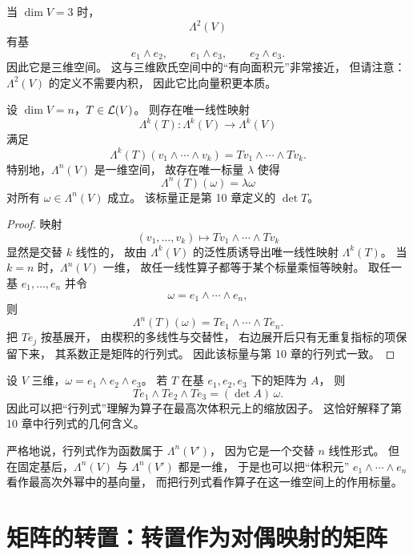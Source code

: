 \begin{example} 当 $\dim V=3$ 时， \[ \Lambda^2(V) \] 有基 \[ e_1\wedge e_2,\qquad e_1\wedge e_3,\qquad e_2\wedge e_3. \] 因此它是三维空间。 这与三维欧氏空间中的“有向面积元”非常接近， 但请注意：$\Lambda^2(V)$ 的定义不需要内积， 因此它比向量积更本质。 \end{example}




\begin{theorem} 设 $\dim V=n$，$T\in\mathcal{L}(V)$。 则存在唯一线性映射 \[ \Lambda^k(T):\Lambda^k(V)\to\Lambda^k(V) \] 满足 \[ \Lambda^k(T)(v_1\wedge\cdots\wedge v_k)=Tv_1\wedge\cdots\wedge Tv_k. \] 特别地，$\Lambda^n(V)$ 是一维空间， 故存在唯一标量 $\lambda$ 使得 \[ \Lambda^n(T)(\omega)=\lambda\omega \] 对所有 $\omega\in\Lambda^n(V)$ 成立。 该标量正是第 10 章定义的 $\det T$。 \end{theorem}




\begin{proof} 映射 \[ (v_1,\dots,v_k)\longmapsto Tv_1\wedge\cdots\wedge Tv_k \] 显然是交替 $k$ 线性的， 故由 $\Lambda^k(V)$ 的泛性质诱导出唯一线性映射 $\Lambda^k(T)$。 当 $k=n$ 时，$\Lambda^n(V)$ 一维， 故任一线性算子都等于某个标量乘恒等映射。 取任一基 $e_1,\dots,e_n$ 并令 \[ \omega=e_1\wedge\cdots\wedge e_n, \] 则 \[ \Lambda^n(T)(\omega)=Te_1\wedge\cdots\wedge Te_n. \] 把 $Te_j$ 按基展开， 由楔积的多线性与交替性， 右边展开后只有无重复指标的项保留下来， 其系数正是矩阵的行列式。 因此该标量与第 10 章的行列式一致。 \end{proof}




\begin{example} 设 $V$ 三维，$\omega=e_1\wedge e_2\wedge e_3$。 若 $T$ 在基 $e_1,e_2,e_3$ 下的矩阵为 $A$， 则 \[ Te_1\wedge Te_2\wedge Te_3=(\det A)\,\omega. \] 因此可以把“行列式”理解为算子在最高次体积元上的缩放因子。 这恰好解释了第 10 章中行列式的几何含义。 \end{example}




\begin{remark} 严格地说，行列式作为函数属于 $\Lambda^n(V')$， 因为它是一个交替 $n$ 线性形式。 但在固定基后，$\Lambda^n(V)$ 与 $\Lambda^n(V')$ 都是一维， 于是也可以把“体积元” $e_1\wedge\cdots\wedge e_n$ 看作最高次外幂中的基向量， 而把行列式看作算子在这一维空间上的作用标量。 \end{remark}




\section{矩阵的转置：转置作为对偶映射的矩阵}




